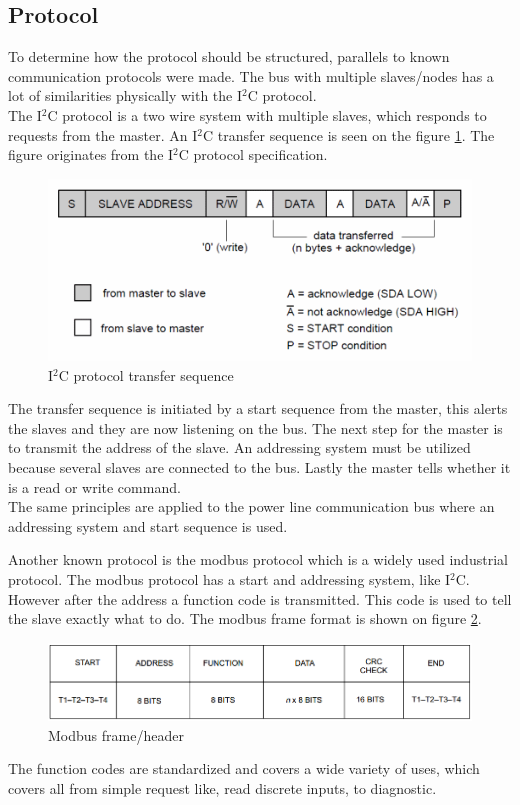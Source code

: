 \subsection{Protocol}
To determine how the protocol should be structured, parallels to known communication protocols were made. The bus with multiple slaves/nodes has a lot of similarities physically with the I$^2$C protocol.\\
The I$^2$C protocol is a two wire system with multiple slaves, which responds to requests from the master. An I$^2$C transfer sequence is seen on the figure \ref{fig:i2cheader}. The figure originates from the I$^2$C protocol specification\cite{I2CInfo}.
\begin{figure}[H]
	\centering
	\includegraphics[width=.8\textwidth]{billeder/10technologystudies/7-bit-address-writing}
	\caption{I$^2$C protocol transfer sequence}
	\label{fig:i2cheader}
\end{figure}
The transfer sequence is initiated by a start sequence from the master, this alerts the slaves and they are now listening on the bus. The next step for the master is to transmit the address of the slave. An addressing system must be utilized because several slaves are connected to the bus. Lastly the master tells whether it is a read or write command. \\
The same principles are applied to the power line communication bus where an addressing system and start sequence is used.

Another known protocol is the modbus protocol\cite{Mbspec} which is a widely used industrial protocol. The modbus protocol has a start and addressing system, like I$^2$C. However after the address a function code is transmitted. This code is used to tell the slave exactly what to do. The modbus frame format is shown on figure \ref{fig:modbusframe}.
\begin{figure}[H]
	\centering
	\includegraphics[width=.8\textwidth]{billeder/10technologystudies/modbusframe}
	\caption{Modbus frame/header}
	\label{fig:modbusframe}
\end{figure}
The function codes are standardized and covers a wide variety of uses, which covers all from simple request like, read discrete inputs, to diagnostic.
